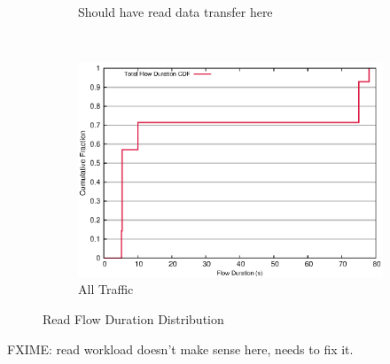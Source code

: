 \begin{figure}[!htpb]
\begin{subfigure}[b]{.45\linewidth}
	\caption{Should have read data transfer here}\label{fig:read_duration:nn_rpc}
   \end{subfigure} \\%
  \begin{subfigure}[b]{.55\linewidth}
   \centering
	\includegraphics[width=.99\textwidth]{figures/4read/flow_duration.eps}
	\caption{All Traffic}\label{fig:read_duration:all}
   \end{subfigure}%
\caption{Read Flow Duration Distribution}
\label{fig:read_duration}
\end{figure}

FXIME: read workload doesn't make sense here, needs to fix it.


